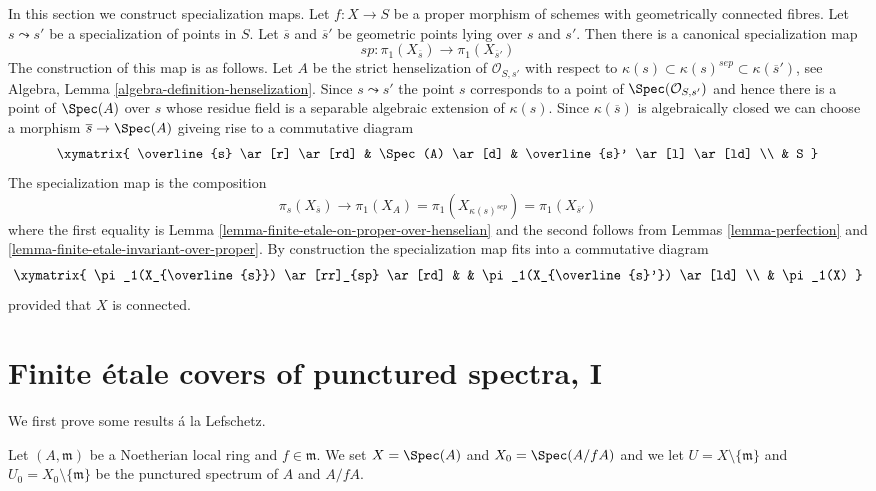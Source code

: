 \noindent
In this section we construct specialization maps.
Let $f : X \to S$ be a proper morphism of schemes
with geometrically connected fibres.
Let $s \leadsto s'$ be a specialization of points in $S$.
Let $\overline{s}$ and $\overline{s}'$ be geometric points
lying over $s$ and $s'$.
Then there is a canonical specialization map
$$
sp : \pi_1(X_{\overline{s}}) \longrightarrow \pi_1(X_{\overline{s}'})
$$
The construction of this map is as follows.
Let $A$ be the strict henselization of $\mathcal{O}_{S, s'}$
with respect to
$\kappa(s) \subset \kappa(s)^{sep} \subset \kappa(\overline{s}')$, see
Algebra, Lemma \ref{algebra-definition-henselization}.
Since $s \leadsto s'$ the point $s$ corresponds to a point of
$\Spec(\mathcal{O}_{S, s'})$ and hence there is a point of
$\Spec(A)$ over $s$ whose residue field is a separable algebraic
extension of $\kappa(s)$.
Since $\kappa(\overline{s})$ is algebraically closed we can choose
a morphism $\overline{s} \to \Spec(A)$ giveing rise to a commutative
diagram
$$
\xymatrix{
\overline{s} \ar[r] \ar[rd] &
\Spec(A) \ar[d] &
\overline{s}' \ar[l] \ar[ld] \\
& S
}
$$
The specialization map is the composition
$$
\pi_s(X_{\overline{s}}) \longrightarrow
\pi_1(X_A) =
\pi_1(X_{\kappa(s)^{sep}}) =
\pi_1(X_{\overline{s}'})
$$
where the first equality is
Lemma \ref{lemma-finite-etale-on-proper-over-henselian}
and the second follows from
Lemmas \ref{lemma-perfection} and
\ref{lemma-finite-etale-invariant-over-proper}.
By construction the specialization map fits into a commutative
diagram
$$
\xymatrix{
\pi_1(X_{\overline{s}}) \ar[rr]_{sp} \ar[rd] & &
\pi_1(X_{\overline{s}'}) \ar[ld] \\
& \pi_1(X)
}
$$
provided that $X$ is connected.









\section{Finite \'etale covers of punctured spectra, I}
\label{section-pi1-punctured-spec}

\noindent
We first prove some results \'a la Lefschetz.

\begin{situation}
\label{situation-local-lefschetz}
Let $(A, \mathfrak m)$ be a Noetherian local ring and $f \in \mathfrak m$.
We set $X = \Spec(A)$ and $X_0 = \Spec(A/fA)$ and we
let $U = X \setminus \{\mathfrak m\}$ and
$U_0 = X_0 \setminus \{\mathfrak m\}$ be the punctured spectrum of
$A$ and $A/fA$.
\end{situation}

